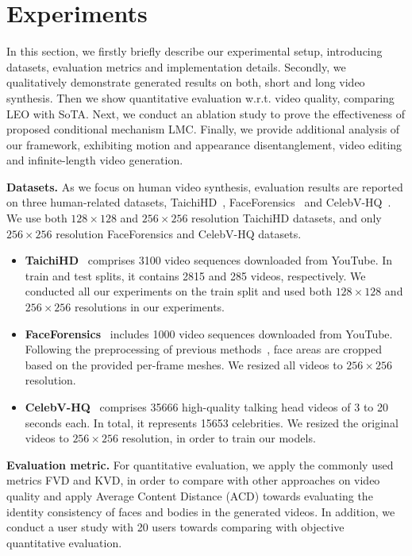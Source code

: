 \section{Experiments}
In this section, we firstly briefly describe our experimental setup, introducing datasets, evaluation metrics and implementation details. Secondly, we qualitatively demonstrate generated results on both, short and long video synthesis. Then we show quantitative evaluation w.r.t. video quality, comparing LEO with SoTA. Next, we conduct an ablation study to prove the effectiveness of proposed conditional mechanism LMC. Finally, we provide additional analysis of our framework, exhibiting motion and appearance disentanglement, video editing and infinite-length video generation. 

\textbf{Datasets.} As we focus on human video synthesis, evaluation results are reported on three human-related datasets, TaichiHD~\cite{fomm}, FaceForensics~\cite{rossler2018faceforensics} and CelebV-HQ~\cite{zhu2022celebvhq}. We 
use both $128\times 128$ and $256\times 256$ resolution TaichiHD datasets, and only $256\times 256$ resolution FaceForensics and CelebV-HQ datasets.

\begin{itemize}
    \item \textbf{TaichiHD}~\cite{fomm} comprises 3100 video sequences downloaded from YouTube. In train and test splits, it contains 2815 and 285 videos, respectively. We conducted all our experiments on the train split and used both $128\times 128$ and $256\times 256$ resolutions in our experiments.
    \item \textbf{FaceForensics}~\cite{rossler2018faceforensics} includes 1000 video sequences downloaded from YouTube. Following the preprocessing of previous methods~\citep{TGAN2020, stylegan-v}, face areas are cropped based on the provided per-frame meshes. We resized all videos to $256\times 256$ resolution.
    \item \textbf{CelebV-HQ}~\cite{zhu2022celebvhq} comprises 35666 high-quality talking head videos of 3 to 20 seconds each. In total, it represents 15653 celebrities. We resized the original videos to $256\times 256$ resolution, in order to train our models. 
\end{itemize}

\textbf{Evaluation metric.} For quantitative evaluation, we apply the commonly used metrics FVD and KVD, in order to compare with other approaches on video quality and apply Average Content Distance (ACD) towards evaluating the identity consistency of faces and bodies in the generated videos. In addition, we conduct a user study with 20 users towards comparing with objective quantitative evaluation. 

